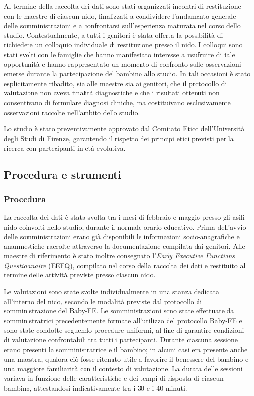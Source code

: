 Al termine della raccolta dei dati sono stati organizzati incontri di restituzione con le maestre di ciascun nido, finalizzati a condividere l'andamento generale delle somministrazioni e a confrontarsi sull'esperienza maturata nel corso dello studio. Contestualmente, a tutti i genitori è stata offerta la possibilità di richiedere un colloquio individuale di restituzione presso il nido. I colloqui sono stati svolti con le famiglie che hanno manifestato interesse a usufruire di tale opportunità e hanno rappresentato un momento di confronto sulle osservazioni emerse durante la partecipazione del bambino allo studio. In tali occasioni è stato esplicitamente ribadito, sia alle maestre sia ai genitori, che il protocollo di valutazione non aveva finalità diagnostiche e che i risultati ottenuti non consentivano di formulare diagnosi cliniche, ma costituivano esclusivamente osservazioni raccolte nell'ambito dello studio.

Lo studio è stato preventivamente approvato dal Comitato Etico dell'Università degli Studi di Firenze, garantendo il rispetto dei principi etici previsti per la ricerca con partecipanti in età evolutiva.

\FloatBarrier

 \subsection{Procedura e strumenti}
 \label{sec:4_2_3}

 \subsubsection{Procedura}
 \label{sec:4_2_3_1}

La raccolta dei dati è stata svolta tra i mesi di febbraio e maggio presso gli asili nido coinvolti nello studio, durante il normale orario educativo. Prima dell'avvio delle somministrazioni erano già disponibili le informazioni socio-anagrafiche e anamnestiche raccolte attraverso la documentazione compilata dai genitori. Alle maestre di riferimento è stato inoltre consegnato l'\emph{Early Executive Functions Questionnaire} (EEFQ), compilato nel corso della raccolta dei dati e restituito al termine delle attività previste presso ciascun nido.

Le valutazioni sono state svolte individualmente in una stanza dedicata all'interno del nido, secondo le modalità previste dal protocollo di somministrazione del Baby-FE. Le somministrazioni sono state effettuate da somministratrici precedentemente formate all'utilizzo del protocollo Baby-FE e sono state condotte seguendo procedure uniformi, al fine di garantire condizioni di valutazione confrontabili tra tutti i partecipanti. Durante ciascuna sessione erano presenti la somministratrice e il bambino; in alcuni casi era presente anche una maestra, qualora ciò fosse ritenuto utile a favorire il benessere del bambino e una maggiore familiarità con il contesto di valutazione. La durata delle sessioni variava in funzione delle caratteristiche e dei tempi di risposta di ciascun bambino, attestandosi indicativamente tra i 30 e i 40 minuti.

